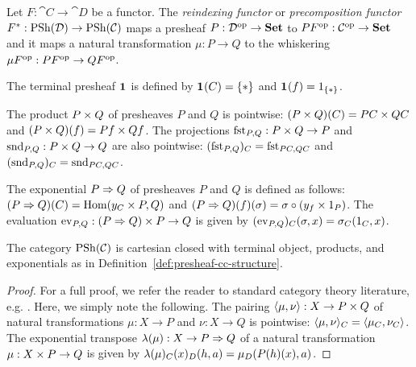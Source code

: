\begin{defn} \label{def:reindexing}
Let $F : \cat{C} \to \cat{D}$ be a functor. The \emph{reindexing functor} or \emph{precomposition functor} $\reind{F} : \PSh{\cat{D}} \to \PSh{\cat{C}}$ maps a presheaf $P : \op{\cat{D}} \to \Set$ to $P\op{F} : \op{\cat{C}} \to \Set$ and it maps a natural transformation $\mu : P \to Q$ to the whiskering $\mu\op{F} : P\op{F} \to Q\op{F}$.
\end{defn}

\begin{defn} \label{def:presheaf-cc-structure}
\hfill \vspace{-3pt}
\begin{items}
    \item The terminal presheaf $\1$ is defined by $\1(C) = \singset$ and $\1(f) = \id[\singset]$.
    \item The product $\cprod{P}{Q}$ of presheaves $P$ and $Q$ is pointwise: $(\cprod{P}{Q})(C) = \cprod{PC}{QC}$ and $(\cprod{P}{Q})(f) = \cprod{Pf}{Qf}$. The projections $\mfst[P,Q] : \cprod{P}{Q} \to P$ and $\msnd[P,Q] : \cprod{P}{Q} \to Q$ are also pointwise: $(\mfst[P,Q])_C = \mfst[PC,QC]$ and $(\msnd[P,Q])_C = \msnd[PC,QC]$.
    \item The exponential $\cexp{P}{Q}$ of presheaves $P$ and $Q$ is defined as follows: $(\cexp{P}{Q})(C) = \Hom{\cprod{\yap{C}}{P}}{Q}$ and $(\cexp{P}{Q})(f)(\sigma) = \sigma \circ (\cprod{y_f}{\id[P]})$. The evaluation $\mev[P,Q] : \cprod{(\cexp{P}{Q})}{P} \to Q$ is given by $(\mev[P,Q])_C(\sigma, x) = \sigma_C(\id[C], x)$.
\end{items}
\end{defn}

\begin{prop} \label{prop:presheaf-cat-is-ccc}
The category $\PSh{\cat{C}}$ is cartesian closed with terminal object, products, and exponentials as in Definition~\ref{def:presheaf-cc-structure}.
\begin{proof}
For a full proof, we refer the reader to standard category theory literature, e.g. \cite{maclane:moerdijk, leinster:basic-ct}. Here, we simply note the following. The pairing $\mpair{\mu}{\nu} : X \to \cprod{P}{Q}$ of natural transformations $\mu : X \to P$ and $\nu : X \to Q$ is pointwise: $\mpair{\mu}{\nu}_C = \mpair{\mu_C}{\nu_C}$. The exponential transpose $\mcurry{\mu} : X \to \cexp{P}{Q}$ of a natural transformation $\mu : \cprod{X}{P} \to Q$ is given by $\mcurry{\mu}_C(x)_D(h, a) = \mu_D(P(h)(x), a)$.
\end{proof}
\end{prop}

